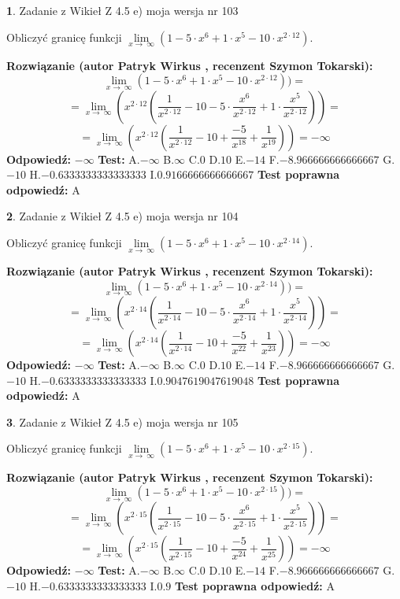 \documentclass[12pt, a4paper]{article}
\theoremstyle{definition} %
\newtheorem{zad}{}
\newcommand{\zadStart}[1]{\begin{zad}#1\newline}
\newcommand{\zadStop}{\end{zad}}
\newcommand{\rozwStart}[2]{\noindent \textbf{Rozwiązanie (autor #1 , recenzent #2): }\newline}
\newcommand{\rozwStop}{\newline}
\newcommand{\odpStart}{\noindent \textbf{Odpowiedź:}\newline}
\newcommand{\odpStop}{\newline}
\newcommand{\testStart}{\noindent \textbf{Test:}\newline}
\newcommand{\testStop}{\newline}
\newcommand{\kluczStart}{\noindent \textbf{Test poprawna odpowiedź:}\newline}
\newcommand{\kluczStop}{\newline}
\begin{document}
\zadStart{Zadanie z Wikieł Z 4.5 e) moja wersja nr 103}


Obliczyć granicę funkcji  $\lim\limits_{x\to\ \infty}(1 - 5 \cdot x^{6}+1 \cdot x^{5}- 10 \cdot x^{2\cdot12})$.
\zadStop
\rozwStart{Patryk Wirkus}{Szymon Tokarski}
$$\lim\limits_{x\to\ \infty}(1 - 5 \cdot x^{6}+1 \cdot x^{5}- 10 \cdot x^{2\cdot12}))=$$
$$=\lim\limits_{x\to\ \infty}(x^{2\cdot12}(\frac{1}{x^{2\cdot12}}-10 -5 \cdot \frac{x^{6}}{x^{2\cdot12}}+1 \cdot \frac{x^{5}}{x^{2\cdot12}}))=$$
$$=\lim\limits_{x\to\ \infty}(x^{2\cdot12}(\frac{1}{x^{2\cdot12}}-10 + \frac{-5}{x^{18}}+ \frac{1}{x^{19}}))=-\infty$$
\rozwStop
\odpStart
$-\infty$
\odpStop
\testStart
A.$-\infty$ B.$\infty$ C.$0$ D.$10$ E.$-14$
F.$-8.966666666666667$ G.$-10$
H.$-0.6333333333333333$
I.$0.9166666666666667$
\testStop
\kluczStart
A
\kluczStop



\zadStart{Zadanie z Wikieł Z 4.5 e) moja wersja nr 104}


Obliczyć granicę funkcji  $\lim\limits_{x\to\ \infty}(1 - 5 \cdot x^{6}+1 \cdot x^{5}- 10 \cdot x^{2\cdot14})$.
\zadStop
\rozwStart{Patryk Wirkus}{Szymon Tokarski}
$$\lim\limits_{x\to\ \infty}(1 - 5 \cdot x^{6}+1 \cdot x^{5}- 10 \cdot x^{2\cdot14}))=$$
$$=\lim\limits_{x\to\ \infty}(x^{2\cdot14}(\frac{1}{x^{2\cdot14}}-10 -5 \cdot \frac{x^{6}}{x^{2\cdot14}}+1 \cdot \frac{x^{5}}{x^{2\cdot14}}))=$$
$$=\lim\limits_{x\to\ \infty}(x^{2\cdot14}(\frac{1}{x^{2\cdot14}}-10 + \frac{-5}{x^{22}}+ \frac{1}{x^{23}}))=-\infty$$
\rozwStop
\odpStart
$-\infty$
\odpStop
\testStart
A.$-\infty$ B.$\infty$ C.$0$ D.$10$ E.$-14$
F.$-8.966666666666667$ G.$-10$
H.$-0.6333333333333333$
I.$0.9047619047619048$
\testStop
\kluczStart
A
\kluczStop



\zadStart{Zadanie z Wikieł Z 4.5 e) moja wersja nr 105}


Obliczyć granicę funkcji  $\lim\limits_{x\to\ \infty}(1 - 5 \cdot x^{6}+1 \cdot x^{5}- 10 \cdot x^{2\cdot15})$.
\zadStop
\rozwStart{Patryk Wirkus}{Szymon Tokarski}
$$\lim\limits_{x\to\ \infty}(1 - 5 \cdot x^{6}+1 \cdot x^{5}- 10 \cdot x^{2\cdot15}))=$$
$$=\lim\limits_{x\to\ \infty}(x^{2\cdot15}(\frac{1}{x^{2\cdot15}}-10 -5 \cdot \frac{x^{6}}{x^{2\cdot15}}+1 \cdot \frac{x^{5}}{x^{2\cdot15}}))=$$
$$=\lim\limits_{x\to\ \infty}(x^{2\cdot15}(\frac{1}{x^{2\cdot15}}-10 + \frac{-5}{x^{24}}+ \frac{1}{x^{25}}))=-\infty$$
\rozwStop
\odpStart
$-\infty$
\odpStop
\testStart
A.$-\infty$ B.$\infty$ C.$0$ D.$10$ E.$-14$
F.$-8.966666666666667$ G.$-10$
H.$-0.6333333333333333$
I.$0.9$
\testStop
\kluczStart
A
\kluczStop
\end{document}

